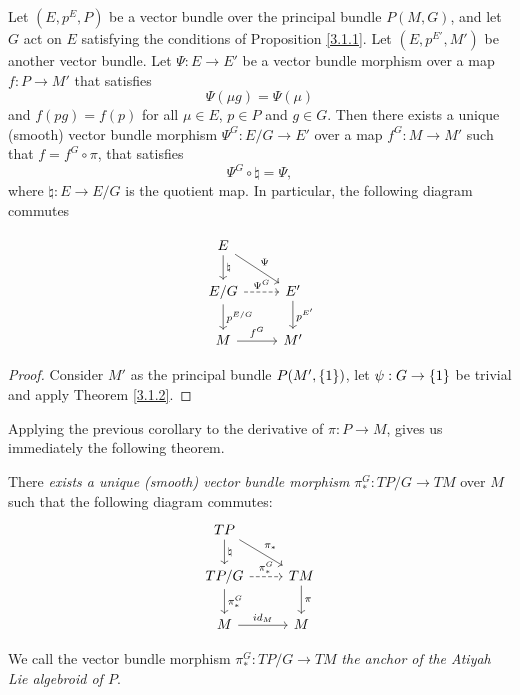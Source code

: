 \begin{corollary}
Let $(E, p^E, P)$ be a vector bundle over the principal bundle $P(M, G)$, and let $G$ act on $E$ satisfying the conditions of Proposition \ref{3.1.1}. Let $(E, p^{E'}, M')$ be another vector bundle. Let $\Psi: E \to E'$ be a vector bundle morphism over a map $f: P \to M'$ that satisfies \[\Psi(\mu g) = \Psi(\mu)\] and $f(pg) = f(p)$ for all $\mu \in E$, $p \in P$ and $g \in G$. Then there exists a unique (smooth) vector bundle morphism $\Psi^{G}: E/G \to E'$ over a map $f^{G}: M \to M'$ such that $f = f^{G} \circ \pi$, that satisfies \[\Psi^{G} \circ \natural = \Psi,\] where $\natural: E \to E/G$ is the quotient map. In particular, the following diagram commutes

\begin{equation} \label{anchorDiagram}
    \begin{tikzcd}
    E \arrow[]{d}{\natural} \arrow[]{dr}{\Psi}& \\
    E/G \arrow[dashed]{r}{\Psi^{G}} \arrow[]{d}{p^{E/G}}& E' \arrow[]{d}{p^{E'}} \\
    M \arrow[]{r}{f^{G}} & M'
    \end{tikzcd}
\end{equation}
\end{corollary}

\begin{proof}
Consider $M'$ as the principal bundle $P(M', \left\{ 1 \right\})$, let $\psi:G \to \left\{ 1 \right\}$ be trivial and apply Theorem \ref{3.1.2}.
\end{proof}

Applying the previous corollary to the derivative of $\pi: P \to M$, gives us immediately the following theorem.

\begin{theorem}\label{anchorAtiyah}
There \emph{exists a unique (smooth) vector bundle morphism} $\pi_*^G: TP/G \to TM$ over $M$ such that the following diagram commutes:
\begin{equation} \label{anchorDiagram}
    \begin{tikzcd}
    TP \arrow[]{d}{\natural} \arrow[]{dr}{\pi_*}& \\
    TP/G \arrow[dashed]{r}{\pi^G_*} \arrow[]{d}{\pi_*^G}& TM \arrow[]{d}{\pi} \\
    M \arrow[]{r}{id_M} & M
    \end{tikzcd}
\end{equation}

We call the vector bundle morphism $\pi^G_*:TP/G \to TM$ \emph{the anchor of the Atiyah Lie algebroid of $P$}.
\end{theorem}

